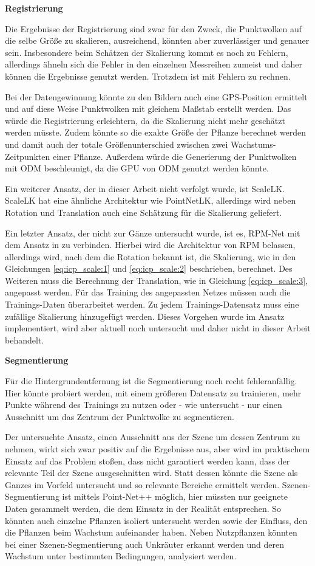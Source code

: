 \documentclass[12pt,titlepage, twoside]{article}
\begin{document}
\textbf{Registrierung}

Die Ergebnisse der Registrierung sind zwar für den Zweck, die Punktwolken auf die selbe Größe zu skalieren, ausreichend, könnten aber zuverlässiger und genauer sein. 
Insbesondere beim Schätzen der Skalierung kommt es noch zu Fehlern, allerdings ähneln sich die Fehler in den einzelnen Messreihen zumeist und daher können die Ergebnisse genutzt werden.
Trotzdem ist mit Fehlern zu rechnen.

Bei der Datengewinnung könnte zu den Bildern auch eine GPS-Position ermittelt und auf diese Weise Punktwolken mit gleichem Maßstab erstellt werden. 
Das würde die Registrierung erleichtern, da die Skalierung nicht mehr geschätzt werden müsste.
Zudem könnte so die exakte Größe der Pflanze berechnet werden und damit auch der totale Größenunterschied zwischen zwei Wachstums-Zeitpunkten einer Pflanze.
Außerdem würde die Generierung der Punktwolken mit ODM beschleunigt, da die GPU von ODM genutzt werden könnte.

Ein weiterer Ansatz, der in dieser Arbeit nicht verfolgt wurde, ist ScaleLK. 
ScaleLK hat eine ähnliche Architektur wie PointNetLK, allerdings wird neben Rotation und Translation auch eine Schätzung für die Skalierung geliefert.

Ein letzter Ansatz, der nicht zur Gänze untersucht wurde, ist es, RPM-Net mit dem Ansatz in \cite{Ziner2005PointSR} zu verbinden.
Hierbei wird die Architektur von RPM belassen, allerdings wird, nach dem die Rotation bekannt ist, die Skalierung, wie in den Gleichungen \ref{eq:icp_scale:1} und \ref{eq:icp_scale:2} beschrieben, berechnet.
Des Weiteren muss die Berechnung der Translation, wie in Gleichung \ref{eq:icp_scale:3}, angepasst werden. Für das Training des angepassten Netzes müssen auch die Trainings-Daten überarbeitet werden. 
Zu jedem Trainings-Datensatz muss eine zufällige Skalierung hinzugefügt werden. Dieses Vorgehen wurde im Ansatz implementiert, wird aber aktuell noch untersucht und daher nicht in dieser Arbeit behandelt.

\textbf{Segmentierung}

Für die Hintergrundentfernung ist die Segmentierung noch recht fehleranfällig. Hier könnte probiert werden, mit einem größeren Datensatz zu trainieren, 
mehr Punkte während des Trainings zu nutzen oder - wie untersucht - nur einen Ausschnitt um das Zentrum der Punktwolke zu segmentieren.

Der untersuchte Ansatz, einen Ausschnitt aus der Szene um dessen Zentrum zu nehmen, wirkt sich zwar positiv auf die Ergebnisse aus, aber wird im praktischem Einsatz auf das Problem stoßen, 
dass nicht garantiert werden kann, dass der relevante Teil der Szene ausgeschnitten wird.
Statt dessen könnte die Szene als Ganzes im Vorfeld untersucht und so relevante Bereiche ermittelt werden. 
Szenen-Segmentierung ist mittels Point-Net++ möglich, hier müssten nur geeignete Daten gesammelt werden, die dem Einsatz in der Realität entsprechen. 
So könnten auch einzelne Pflanzen isoliert untersucht werden sowie der Einfluss, den die Pflanzen beim Wachstum aufeinander haben. 
Neben Nutzpflanzen könnten bei einer Szenen-Segmentierung auch Unkräuter erkannt werden und deren Wachstum unter bestimmten Bedingungen, analysiert werden.
\end{document}
